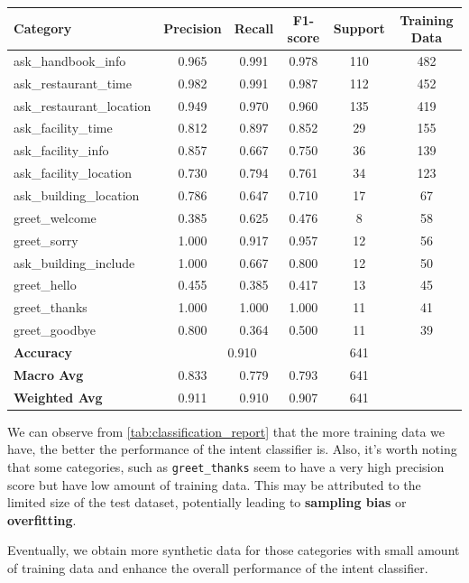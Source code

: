 \documentclass{xum_review}
\begin{document}
\begin{itemize}
\begin{enumerate}
\begin{table}[H]
		\begin{tabular}{l c c c c c} 
		\hline %
		\textbf{Category} & \textbf{Precision} & \textbf{Recall} & \textbf{F1-score} & \textbf{Support} & \textbf{Training Data} \\
		\hline %
		ask\_handbook\_info & 0.965 & 0.991 & 0.978 & 110 & 482 \\
		ask\_restaurant\_time & 0.982 & 0.991 & 0.987 & 112 & 452 \\
		ask\_restaurant\_location & 0.949 & 0.970 & 0.960 & 135 & 419 \\
		ask\_facility\_time & 0.812 & 0.897 & 0.852 & 29 & 155 \\
		ask\_facility\_info & 0.857 & 0.667 & 0.750 & 36 & 139 \\
		ask\_facility\_location & 0.730 & 0.794 & 0.761 & 34 & 123 \\
		ask\_building\_location & 0.786 & 0.647 & 0.710 & 17 & 67 \\
		greet\_welcome & 0.385 & 0.625 & 0.476 & 8 & 58 \\
		greet\_sorry & 1.000 & 0.917 & 0.957 & 12 & 56 \\
		ask\_building\_include & 1.000 & 0.667 & 0.800 & 12 & 50 \\
		greet\_hello & 0.455 & 0.385 & 0.417 & 13 & 45 \\
		greet\_thanks & 1.000 & 1.000 & 1.000 & 11 & 41 \\
		greet\_goodbye & 0.800 & 0.364 & 0.500 & 11 & 39 \\
		\hline %
		\textbf{Accuracy} & \multicolumn{3}{c}{0.910} & 641 & \\ 
		\textbf{Macro Avg} & 0.833 & 0.779 & 0.793 & 641 & \\
		\textbf{Weighted Avg} & 0.911 & 0.910 & 0.907 & 641 & \\
		\hline %
		\end{tabular}
	\end{table}
		We can observe from \cref{tab:classification_report} that the more
		training data we have, the better the performance of the intent
		classifier is. Also, it's worth noting that some categories, such as
		\texttt{greet\_thanks} seem to have a very high precision score but have low
		amount of training data. This may be attributed to the limited size of
		the test dataset, potentially leading to \textbf{sampling bias} or
		\textbf{overfitting}.

		Eventually, we obtain more synthetic data for those categories with small amount
		of training data and enhance the overall performance of the intent classifier.


\end{enumerate}
\end{itemize}
\end{document}

